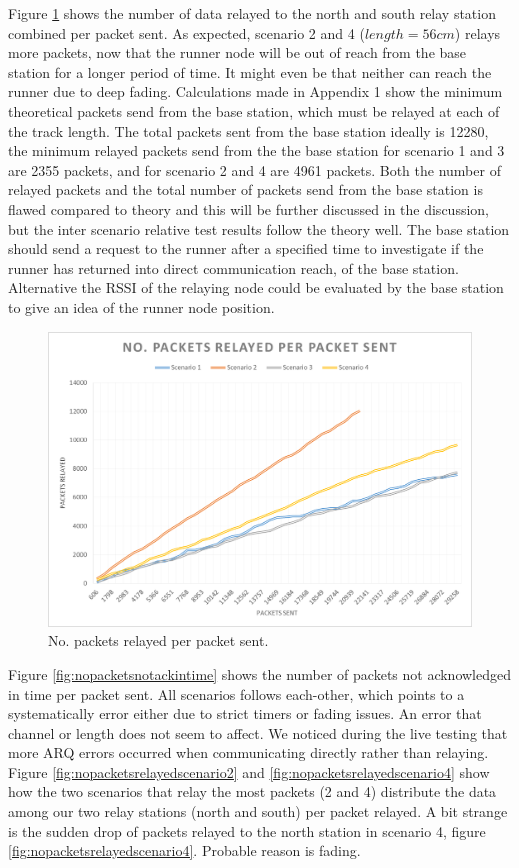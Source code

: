 \noindent Figure \ref{fig:nopacketsrelayed} shows the number of data relayed to the north  and south relay station combined per packet sent. As expected, scenario 2 and 4 ($length=56cm$) relays more packets, now that the runner node will be out of reach from the base station for a longer period of time. It might even be that neither can reach the runner due to deep fading. Calculations made in Appendix 1 show the minimum theoretical packets send from the base station, which must be relayed at each of the track length. The total packets sent from the base station ideally is 12280, the minimum relayed packets send from the the base station for scenario 1 and 3 are 2355 packets, and for scenario 2 and 4 are 4961 packets. Both the number of relayed packets and the total number of packets send from the base station is flawed compared to theory and this will be further discussed in the discussion, but the inter scenario relative test results follow the theory well. The base station should send a request to the runner after a specified time to investigate if the runner has returned into direct communication reach, of the base station. Alternative the RSSI of the relaying node could be evaluated by the base station to give an idea of the runner node position.

\begin{figure}[h]
	\centering
	\includegraphics[width=1\linewidth]{results/NoPacketsRelayed}
	\caption{No. packets relayed per packet sent.}
	\label{fig:nopacketsrelayed}
\end{figure}

\noindent Figure \ref{fig:nopacketsnotackintime} shows the number of packets not acknowledged in time per packet sent. All scenarios follows each-other, which points to a systematically error either due to strict timers or fading issues. An error that channel or length does not seem to affect. We noticed during the live testing that more ARQ errors occurred when communicating directly rather than relaying. Figure \ref{fig:nopacketsrelayedscenario2} and \ref{fig:nopacketsrelayedscenario4} show how the two scenarios that relay the most packets (2 and 4) distribute the data among our two relay stations (north and south) per packet relayed. A bit strange is the sudden drop of packets relayed to the north station in scenario 4, figure  \ref{fig:nopacketsrelayedscenario4}. Probable reason is fading.

